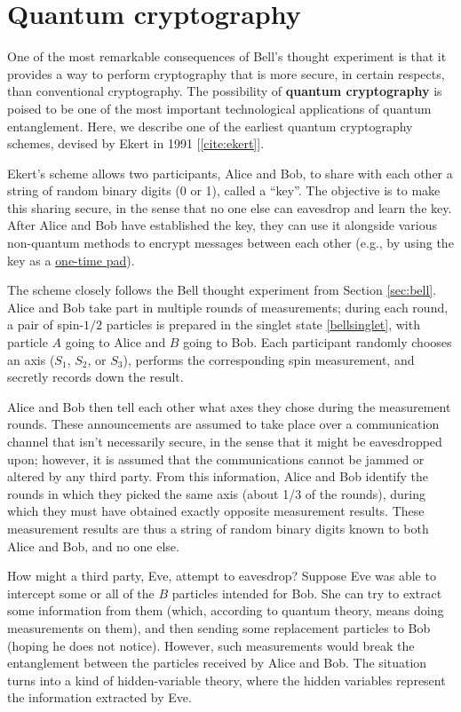 \documentclass[prx,12pt]{revtex4-2}
\begin{document}
\section{Quantum cryptography}

One of the most remarkable consequences of Bell's thought experiment
is that it provides a way to perform cryptography that is more secure,
in certain respects, than conventional cryptography.  The possibility
of \textbf{quantum cryptography} is poised to be one of the most
important technological applications of quantum entanglement.  Here,
we describe one of the earliest quantum cryptography schemes, devised
by Ekert in 1991 [\ref{cite:ekert}].

Ekert's scheme allows two participants, Alice and Bob, to share with
each other a string of random binary digits (0 or 1), called a
``key''.  The objective is to make this sharing secure, in the sense
that no one else can eavesdrop and learn the key.  After Alice and Bob
have established the key, they can use it alongside various
non-quantum methods to encrypt messages between each other (e.g., by using the key as a
\href{https://en.wikipedia.org/wiki/One-time_pad}{one-time pad}).

The scheme closely follows the Bell thought experiment from Section
\ref{sec:bell}.  Alice and Bob take part in multiple rounds of
measurements; during each round, a pair of spin-$1/2$ particles is
prepared in the singlet state \eqref{bellsinglet}, with particle $A$
going to Alice and $B$ going to Bob.  Each participant randomly
chooses an axis ($S_1$, $S_2$, or $S_3$), performs the corresponding
spin measurement, and secretly records down the result.

Alice and Bob then tell each other what axes they chose during the
measurement rounds.  These announcements are assumed to take place
over a communication channel that isn't necessarily secure, in the
sense that it might be eavesdropped upon; however, it is assumed that
the communications cannot be jammed or altered by any third party.
From this information, Alice and Bob identify the rounds in which they
picked the same axis (about 1/3 of the rounds), during which they must
have obtained exactly opposite measurement results.  These measurement
results are thus a string of random binary digits known to both Alice
and Bob, and no one else.

How might a third party, Eve, attempt to eavesdrop?  Suppose Eve was
able to intercept some or all of the $B$ particles intended for Bob.
She can try to extract some information from them (which, according to
quantum theory, means doing measurements on them), and then sending
some replacement particles to Bob (hoping he does not notice).
However, such measurements would break the entanglement between the
particles received by Alice and Bob.  The situation turns into a kind
of hidden-variable theory, where the hidden variables represent the
information extracted by Eve.
\end{document}
